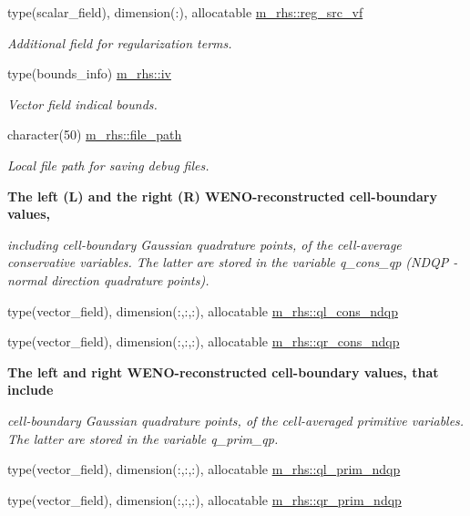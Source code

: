 \begin{DoxyCompactItemize}
type(scalar\+\_\+field), dimension(\+:), allocatable \hyperlink{namespacem__rhs_ae60a6ab812c015411331658e16e5ab77}{m\+\_\+rhs\+::reg\+\_\+src\+\_\+vf}
\begin{DoxyCompactList}\small\item\em Additional field for regularization terms. \end{DoxyCompactList}\item 
type(bounds\+\_\+info) \hyperlink{namespacem__rhs_a4ab97e22609b5ebbb97524ca7bae05ef}{m\+\_\+rhs\+::iv}
\begin{DoxyCompactList}\small\item\em Vector field indical bounds. \end{DoxyCompactList}\item 
character(50) \hyperlink{namespacem__rhs_a31f27cef4252ee5a36802fd02b3f8ac9}{m\+\_\+rhs\+::file\+\_\+path}
\begin{DoxyCompactList}\small\item\em Local file path for saving debug files. \end{DoxyCompactList}\end{DoxyCompactItemize}
\begin{Indent}\textbf{ The left (L) and the right (R) W\+E\+N\+O-\/reconstructed cell-\/boundary values,}\par
{\em including cell-\/boundary Gaussian quadrature points, of the cell-\/average conservative variables. The latter are stored in the variable q\+\_\+cons\+\_\+qp (N\+D\+QP -\/ normal direction quadrature points). }\begin{DoxyCompactItemize}
\item 
type(vector\+\_\+field), dimension(\+:,\+:,\+:), allocatable \hyperlink{namespacem__rhs_abe42bc1610e9369b701122a870fed48d}{m\+\_\+rhs\+::ql\+\_\+cons\+\_\+ndqp}
\item 
type(vector\+\_\+field), dimension(\+:,\+:,\+:), allocatable \hyperlink{namespacem__rhs_a1b6a05895f56a60c075e4eee3f1b4d51}{m\+\_\+rhs\+::qr\+\_\+cons\+\_\+ndqp}
\end{DoxyCompactItemize}
\end{Indent}
\begin{Indent}\textbf{ The left and right W\+E\+N\+O-\/reconstructed cell-\/boundary values, that include}\par
{\em cell-\/boundary Gaussian quadrature points, of the cell-\/averaged primitive variables. The latter are stored in the variable q\+\_\+prim\+\_\+qp. }\begin{DoxyCompactItemize}
\item 
type(vector\+\_\+field), dimension(\+:,\+:,\+:), allocatable \hyperlink{namespacem__rhs_aeb611ac510e15d25ae5313627f9a55af}{m\+\_\+rhs\+::ql\+\_\+prim\+\_\+ndqp}
\item 
type(vector\+\_\+field), dimension(\+:,\+:,\+:), allocatable \hyperlink{namespacem__rhs_addb553c30e5a799670b33c66a27995d6}{m\+\_\+rhs\+::qr\+\_\+prim\+\_\+ndqp}
\end{DoxyCompactItemize}
\end{Indent}
